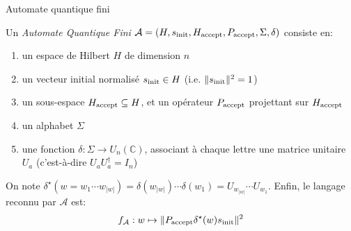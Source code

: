 \documentclass[aspectratio=169]{beamer}
\theoremstyle{plain}
\theoremstyle{definition}
\begin{document}
\begin{frame}{Automate quantique fini}
    \begin{definition}[AQF]
        Un \emph{Automate Quantique Fini} $\mathcal{A}=(H, s_{\textnormal{init}}, H_{\textnormal{accept}}, P_{\textnormal{accept}}, \Sigma, \delta)$ consiste en:
        \begin{enumerate}[label=--, noitemsep]
            \item un espace de Hilbert $H$ de dimension $n$
            \item un vecteur initial normalisé $s_{\textnormal{init}}\in H$ (i.e. $\|s_{\textnormal{init}}\|^2=1$)
            \item un sous-espace $H_{\textnormal{accept}} \subseteq H$, et un opérateur $P_{\textnormal{accept}}$ projettant sur $H_{\textnormal{accept}}$
            \item un alphabet $\Sigma$
            \item une fonction $\delta : \Sigma \to U_n(\mathbb{C})$, associant à chaque lettre une matrice unitaire $U_a$ (c'est-à-dire $U_aU_a^\dagger = I_n$)
        \end{enumerate}
        
        On note $\delta^\star(w=w_1\cdots w_{|w|}) = \delta(w_{|w|})\cdots \delta(w_1) = U_{w_{|w|}}\cdots U_{w_1}$. Enfin, le langage reconnu par $\mathcal{A}$ est:
        \begin{equation*}
            f_{\mathcal{A}} : w \mapsto \|P_{\textnormal{accept}}\delta^\star(w)s_{\textnormal{init}}\|^2
        \end{equation*}
    \end{definition}
\end{frame}
\end{document}
